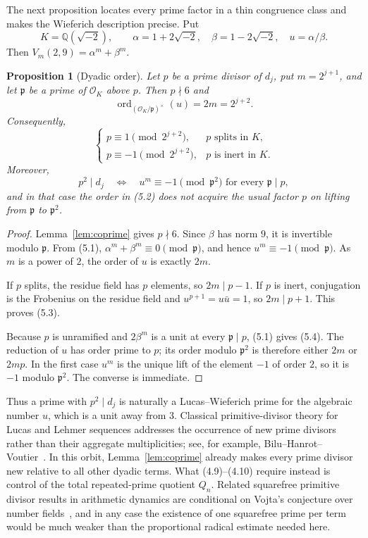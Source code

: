 \documentclass[11pt]{article}
\newtheorem{proposition}[theorem]{Proposition}
\theoremstyle{remark}
\newcommand{\ord}{\operatorname{ord}}
\newcommand{\QQ}{\mathbb{Q}}
\newcommand{\OK}{\mathcal{O}_K}
\begin{document}
The next proposition locates every prime factor in a thin congruence
class and makes the Wieferich description precise.  Put
\[
 K=\QQ(\sqrt{-2}),\qquad
 \alpha=1+2\sqrt{-2},\quad\beta=1-2\sqrt{-2},\quad
 u=\alpha/\beta.
\]
Then \(V_m(2,9)=\alpha^m+\beta^m\).

\begin{proposition}[Dyadic order]\label{prop:order}
Let \(p\) be a prime divisor of \(d_j\), put \(m=2^{j+1}\), and let
\(\mathfrak p\) be a prime of \(\OK\) above \(p\).  Then \(p\nmid6\) and
\[
 \ord_{(\OK/\mathfrak p)^\times}(u)=2m=2^{j+2}.            \tag{5.2}
\]
Consequently,
\[
 \begin{cases}
 p\equiv 1\pmod{2^{j+2}},&p\text{ splits in }K,\\
 p\equiv-1\pmod{2^{j+2}},&p\text{ is inert in }K.
 \end{cases}                                               \tag{5.3}
\]
Moreover,
\[
 p^2\mid d_j
 \quad\Longleftrightarrow\quad
 u^m\equiv-1\pmod{\mathfrak p^2}
 \text{ for every }\mathfrak p\mid p,                     \tag{5.4}
\]
and in that case the order in (5.2) does not acquire the usual factor
\(p\) on lifting from \(\mathfrak p\) to \(\mathfrak p^2\).
\end{proposition}

\begin{proof}
Lemma~\ref{lem:coprime} gives \(p\nmid6\).  Since \(\beta\) has norm \(9\),
it is invertible modulo \(\mathfrak p\).  From (5.1),
\(\alpha^m+\beta^m\equiv0\pmod{\mathfrak p}\), and hence
\(u^m\equiv-1\pmod{\mathfrak p}\).  As \(m\) is a power of \(2\), the
order of \(u\) is exactly \(2m\).

If \(p\) splits, the residue field has \(p\) elements, so \(2m\mid p-1\).
If \(p\) is inert, conjugation is the Frobenius on the residue field and
\(u^{p+1}=u\bar u=1\), so \(2m\mid p+1\).  This proves (5.3).

Because \(p\) is unramified and \(2\beta^m\) is a unit at every
\(\mathfrak p\mid p\), (5.1) gives (5.4).  The reduction of \(u\) has
order prime to \(p\); its order modulo \(\mathfrak p^2\) is therefore
either \(2m\) or \(2mp\).  In the first case \(u^m\) is the unique lift of
the element \(-1\) of order \(2\), so it is \(-1\) modulo
\(\mathfrak p^2\).  The converse is immediate.
\end{proof}

Thus a prime with \(p^2\mid d_j\) is naturally a Lucas--Wieferich prime
for the algebraic number \(u\), which is a unit away from \(3\).
Classical primitive-divisor theory for
Lucas and Lehmer sequences addresses the occurrence of new prime divisors
rather than their aggregate multiplicities; see, for example,
Bilu--Hanrot--Voutier~\cite{BiluHanrotVoutier2001}.  In this orbit,
Lemma~\ref{lem:coprime} already makes every prime divisor new relative to
all other dyadic terms.  What (4.9)--(4.10) require instead is control of
the total repeated-prime quotient \(Q_n\).  Related squarefree primitive
divisor results in arithmetic dynamics are conditional on Vojta's
conjecture over number fields~\cite{GhiocaNguyenTucker2018}, and in any
case the existence of one squarefree prime per term would be much weaker
than the proportional radical estimate needed here.
\end{document}
